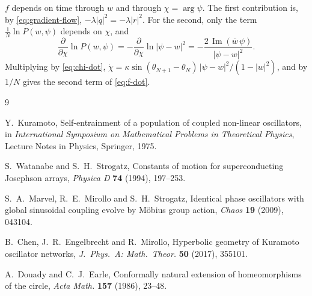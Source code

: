 \documentclass[a4paper,11pt]{article}
\newcommand{\conj}[1]{\overline{#1}}
\newcommand{\im}{\operatorname{Im}}
\theoremstyle{remark}
\begin{document}
$f$ depends on time through $w$ and through $\chi=\arg\psi$. The first
contribution is, by \eqref{eq:gradient-flow}, $-\lambda|q|^2=-\lambda|r|^2$.
For the second, only the term $\frac1N\ln P(w,\psi)$ depends on $\chi$, and
\[
\frac{\partial}{\partial\chi}\ln P(w,\psi)
=-\frac{\partial}{\partial\chi}\ln|\psi-w|^2
=-\frac{2\,\im(\conj w\,\psi)}{|\psi-w|^2}.
\]
Multiplying by \eqref{eq:chi-dot},
$\dot\chi=\kappa\sin(\theta_{N+1}-\theta_N)\,|\psi-w|^2/(1-|w|^2)$, and by
$1/N$ gives the second term of \eqref{eq:f-dot}.

\begin{thebibliography}{9}

Y.~Kuramoto, Self-entrainment of a population of coupled non-linear
oscillators, in \emph{International Symposium on Mathematical Problems in
Theoretical Physics}, Lecture Notes in Physics, Springer, 1975.

S.~Watanabe and S.~H.~Strogatz, Constants of motion for superconducting
Josephson arrays, \emph{Physica D} \textbf{74} (1994), 197--253.

S.~A.~Marvel, R.~E.~Mirollo and S.~H.~Strogatz, Identical phase oscillators
with global sinusoidal coupling evolve by M\"obius group action, \emph{Chaos}
\textbf{19} (2009), 043104.

B.~Chen, J.~R.~Engelbrecht and R.~Mirollo, Hyperbolic geometry of Kuramoto
oscillator networks, \emph{J.~Phys.~A: Math.~Theor.} \textbf{50} (2017),
355101.

A.~Douady and C.~J.~Earle, Conformally natural extension of homeomorphisms of
the circle, \emph{Acta Math.} \textbf{157} (1986), 23--48.

\end{thebibliography}
\end{document}
